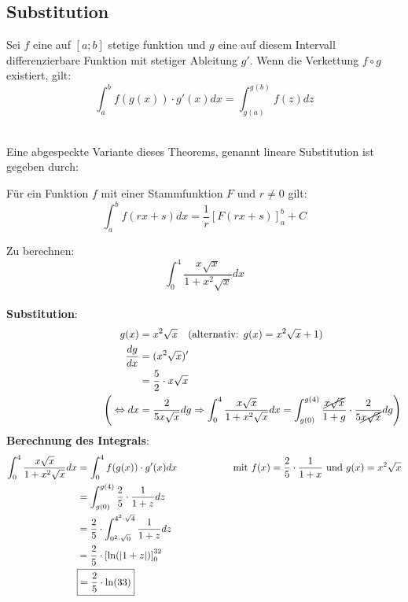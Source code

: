 \documentclass[main.tex]{subfiles}
\begin{document}
\subsection{Substitution}
\begin{Theorem}
  Sei $f$ eine auf $[a;b]$ stetige funktion und $g$ eine auf diesem Intervall differenzierbare Funktion mit stetiger Ableitung
  $g'$. Wenn die Verkettung $f \circ g$ existiert, gilt:
  $$\int_a^b f(g(x))\cdot g'(x)dx=\int_{g(a)}^{g(b)}f(z)dz$$
\end{Theorem}\\
Eine abgespeckte Variante dieses Theorems, genannt lineare Substitution ist gegeben durch:
\begin{Theorem}
  Für ein Funktion $f$ mit einer Stammfunktion $F$ und $r\neq 0$ gilt:
  $$\int_a^b f(rx+s)dx=\dfrac{1}{r}[F(rx+s)]_a^b + C$$
\end{Theorem}
\begin{Beispiel}
    Zu berechnen: $$\int_0^4 \dfrac{x\sqrt{x}}{1 + x^2\sqrt{x}} dx$$ \\
    \textbf{Substitution}:
    \begin{align*}
        \quad \qquad \qquad \qquad \qquad \qquad
        g(x) &= x^2\sqrt{x} \quad (\text{alternativ: } g(x) = x^2\sqrt{x} + 1) \\
        \dfrac{dg}{dx} &= (x^2\sqrt{x})' \\
                          &= \dfrac{5}{2} \cdot x\sqrt{x} \\
        \Bigg(\Leftrightarrow dx &= \dfrac{2}{5x\sqrt{x}}dg \Rightarrow \int_0^4 \dfrac{x\sqrt{x}}{1 + x^2\sqrt{x}} dx = \int_{g(0)}^{g(4)} \dfrac{\cancel{x\sqrt{x}}}{1 + g} \cdot \dfrac{2}{5\cancel{x\sqrt{x}}}dg\Bigg)
    \end{align*}
    \textbf{Berechnung des Integrals}:
    \begin{align*}
        \int_0^4 \dfrac{x\sqrt{x}}{1 + x^2\sqrt{x}} dx &= \int_0^4 f(g(x))\cdot g'(x)dx \text{\hspace{2cm}mit $f(x)=\dfrac{2}{5} \cdot \dfrac{1}{1+x}$ und $g(x) = x^2\sqrt{x}$}\\
        &= \int_{g(0)}^{g(4)} \dfrac{2}{5} \cdot\dfrac{1}{1 + z}dz \\
        &= \dfrac{2}{5} \cdot \int_{0^2\cdot\sqrt{0}}^{4^2\cdot\sqrt{4}} \dfrac{1}{1 + z}dz \\
        &= \dfrac{2}{5} \cdot \left[\ln(|1 + z|)\right]_0^{32} \\
        &\boxed{= \dfrac{2}{5} \cdot \ln(33)}
    \end{align*}
\end{Beispiel}
\end{document}
